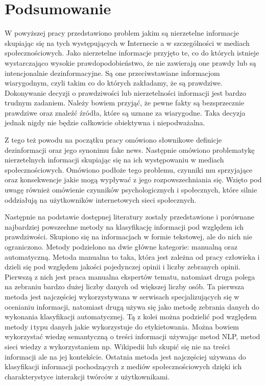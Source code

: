 \newpage %
\section{Podsumowanie}
W powyższej pracy przedstawiono problem jakim są nierzetelne informacje skupiając się na tych występujących w Internecie a w szczególności w mediach społecznościowych. Jako nierzetelne informacje przyjęto te, co do których istnieje wystarczająco wysokie prawdopodobieństwo, że nie zawierają one prawdy lub są intencjonalnie dezinformacyjne. Są one przeciwstawiane informacjom wiarygodnym, czyli takim co do których zakładamy, że są prawdziwe. Dokonywanie decyzji o prawdziwości lub nierzetelności informacji jest bardzo trudnym zadaniem. Należy bowiem przyjąć, że pewne fakty są bezsprzecznie prawdziwe oraz znaleźć źródła, które są uznane za wiarygodne. Taka decyzja jednak nigdy nie będzie całkowicie obiektywna i niepodważalna. 
\par
Z tego też powodu na początku pracy omówiono słownikowe definicje dezinformacji oraz jego synonimu fake news. Następnie omówiono problematykę nierzetelnych informacji skupiając się na ich występowaniu w mediach społecznościowych. Omówiono podłoże tego problemu, czynniki mu sprzyjające oraz konsekwencje jakie mogą wypływać z jego rozpowszechniania się. Wzięto pod uwagę również omówienie czynników psychologicznych i społecznych, które silnie oddziałują na użytkowników internetowych sieci społecznych. 
\par 
Następnie na podstawie dostępnej literatury zostały przedstawione i porównane najbardziej powszechne metody na klasyfikację informacji pod względem ich prawdziwości. Skupiono się na informacjach w formie tekstowej, ale do nich nie ograniczono. Metody podzielono na dwie główne kategorie: manualną oraz automatyczną. Metoda manualna to taka, która jest zależna od pracy człowieka i dzieli się pod względem jakości pojedynczej opinii i liczby zebranych opinii. Pierwszą z nich jest praca manualna ekspertów tematu, natomiast druga polega na zebraniu bardzo dużej liczby danych od większej liczby osób. Ta pierwsza metoda jest najczęściej wykorzystywana w serwisach specjalizujących się w ocenianiu informacji, natomiast drugą używa się jako metodę zebrania danych do wykonania klasyfikacji automatycznej. Tą z kolei można podzielić pod względem metody i\,typu danych jakie wykorzystuje do etykietowania. Można bowiem wykorzystać wiedzę semantyczną o treści informacji używając metod NLP, metod sieci wiedzy z wykorzystaniem np. Wikipedii lub skupić się nie na treści informacji ale na jej kontekście. Ostatnia metoda jest najczęściej używana do klasyfikacji informacji pochodzących z mediów społecznościowych dzięki ich charakterystyce interakcji twórców z użytkownikami. 
